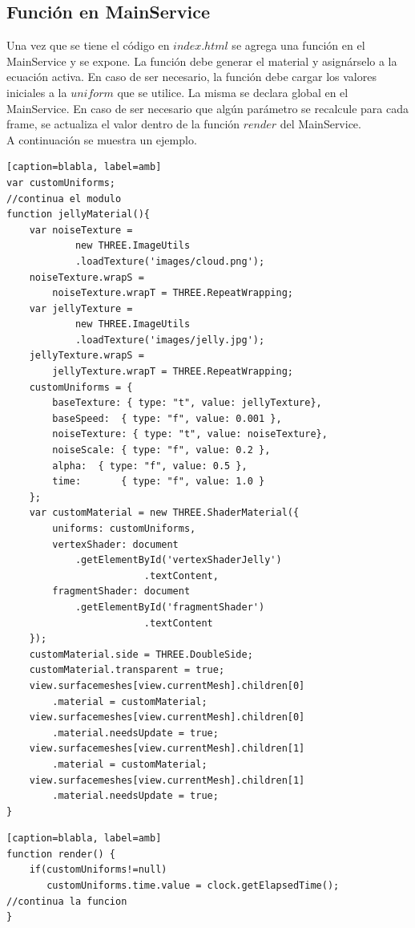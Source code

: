 \documentclass[12pt]{article}
\begin{document}
\subsection{Función en MainService}
Una vez que se tiene el código en $index.html$ se agrega una función en el MainService y se expone. La función debe generar el material y asignárselo a la ecuación activa. En caso de ser necesario, la función debe cargar los valores iniciales a la $uniform$ que se utilice. La misma se declara global en el MainService. En caso de ser necesario que algún parámetro se recalcule para cada frame, se actualiza el valor dentro de la función $render$ del MainService.
\\A continuación se muestra un ejemplo.
\clearpage
\begin{lstlisting}[frame=single][caption=blabla, label=amb]
var customUniforms;
//continua el modulo
function jellyMaterial(){
	var noiseTexture = 
    		new THREE.ImageUtils
			.loadTexture('images/cloud.png');
	noiseTexture.wrapS = 
		noiseTexture.wrapT = THREE.RepeatWrapping; 		
	var jellyTexture = 
    		new THREE.ImageUtils
			.loadTexture('images/jelly.jpg');
	jellyTexture.wrapS = 
		jellyTexture.wrapT = THREE.RepeatWrapping; 
	customUniforms = {
		baseTexture: { type: "t", value: jellyTexture},
		baseSpeed: 	{ type: "f", value: 0.001 },
		noiseTexture: { type: "t", value: noiseTexture},
		noiseScale:	{ type: "f", value: 0.2 },
		alpha: 	{ type: "f", value: 0.5 },
		time: 		{ type: "f", value: 1.0 }
	};
	var customMaterial = new THREE.ShaderMaterial({
	    uniforms: customUniforms,
		vertexShader: document
			.getElementById('vertexShaderJelly')
        				.textContent,
		fragmentShader: document
			.getElementById('fragmentShader')
        				.textContent
	});
	customMaterial.side = THREE.DoubleSide;
	customMaterial.transparent = true;
	view.surfacemeshes[view.currentMesh].children[0]
		.material = customMaterial;
	view.surfacemeshes[view.currentMesh].children[0]
		.material.needsUpdate = true;
	view.surfacemeshes[view.currentMesh].children[1]
		.material = customMaterial;
	view.surfacemeshes[view.currentMesh].children[1]
		.material.needsUpdate = true;
}
\end{lstlisting}
\clearpage
\begin{lstlisting}[frame=single][caption=blabla, label=amb]
function render() {
	if(customUniforms!=null)
	   customUniforms.time.value = clock.getElapsedTime();
//continua la funcion
}
\end{lstlisting}
\clearpage
\end{document}

